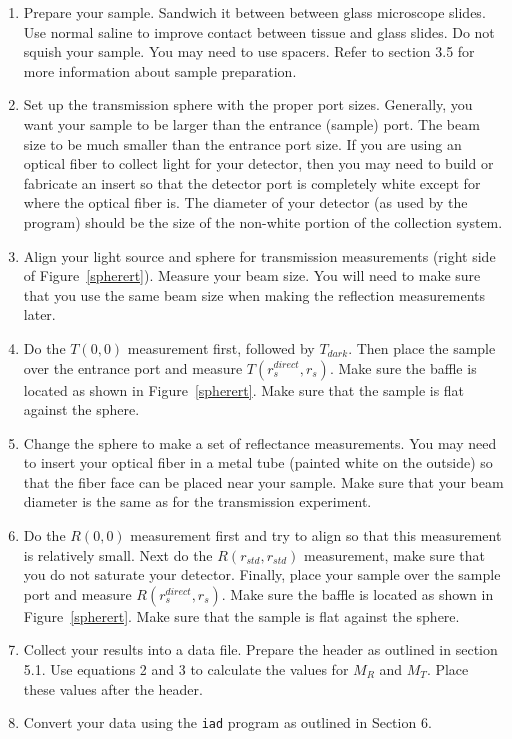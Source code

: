 \documentclass{article}
\newcommand\iadprog{\texttt{iad}}
\begin{document}
\begin{enumerate}
\item 
Prepare your sample.  Sandwich it between between glass microscope
slides.  Use normal saline to improve contact between tissue and glass slides.
Do not
squish your sample.  You may need to use spacers.
Refer to section 3.5 for more information about sample preparation.  

\item
Set up the transmission sphere with the proper port sizes.  Generally, you want your sample
to be larger than the entrance (sample) port. The beam size to be much smaller 
than the entrance port size.  If you are using an optical fiber to collect light
for your detector, then you may need to build or fabricate an insert so that
the detector port is completely white except for where the optical fiber is.
The diameter of your detector (as used by the program) should be the size of
the non-white portion of the collection system.

\item
Align your light source and sphere for  transmission measurements
(right side of Figure~\ref{spherert}).  Measure your beam size.  You will
need to make sure that you use the same beam size when making the
reflection measurements later.

\item
Do the $T(0,0)$ measurement first, followed by $T_\mathit{dark}$.  Then
place the sample over the entrance port and measure $T(r_s^\mathit{direct},r_s)$.
Make sure the baffle is located as shown in Figure~\ref{spherert}.
Make sure that the sample is flat against the sphere.  

\item
Change the sphere to make a set of reflectance measurements.  You may need
to insert your optical fiber in a metal tube (painted white on the outside)
so that the fiber face can be placed near your sample.  Make sure that your
beam diameter is the same as for the transmission experiment.

\item
Do the $R(0,0)$ measurement first and try to align so that this measurement
is relatively small.  Next do the $R(r_\mathit{std},r_\mathit{std})$ measurement,
make sure that you do not saturate your detector.  Finally, place your
sample over the sample port and measure $R(r_s^\mathit{direct},r_s)$.
Make sure the baffle is located as shown in Figure~\ref{spherert}.
Make sure that the sample is flat against the sphere.  

\item
Collect your results into a data file.  Prepare the header as outlined in
section 5.1.  Use equations 2 and 3 to calculate the values for $M_R$ and
$M_T$.  Place these values after the header.

\item
Convert your data using the \iadprog{} program as outlined in Section 6.


\end{enumerate}
\end{document}
